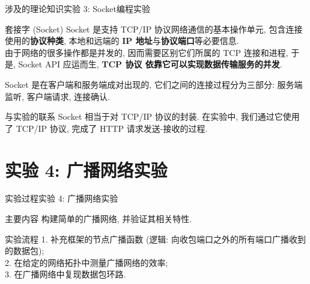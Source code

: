 \documentclass{beamer}
\begin{document}
\begin{frame}{涉及的理论知识}{实验 3: Socket编程实验}
    \begin{block}{套接字 (Socket)}
        Socket 是支持 TCP/IP 协议网络通信的基本操作单元,
        包含连接使用的\textbf{协议种类}, 本地和远端的
        \textbf{IP 地址}与\textbf{协议端口}等必要信息.\\
        由于网络的很多操作都是并发的, 因而需要区别它们所属的
        TCP 连接和进程, 于是, Socket API 应运而生, \textbf{TCP 协议
            依靠它可以实现数据传输服务的并发}.
    \end{block}
    Socket 是在客户端和服务端成对出现的,
    它们之间的连接过程分为三部分:
    服务端监听, 客户端请求, 连接确认.
    \begin{exampleblock}{与实验的联系}
        Socket 相当于对 TCP/IP 协议的封装. 在实验中,
        我们通过它使用了 TCP/IP 协议, 完成了 HTTP 请求发送-接收的过程.
    \end{exampleblock}
\end{frame}

\section{实验 4: 广播网络实验}
\begin{frame}
    \sectionpage
\end{frame}

\begin{frame}{实验过程}{实验 4: 广播网络实验}
    \begin{block}{主要内容}
        构建简单的广播网络, 并验证其相关特性.
    \end{block}

    \begin{block}{实验流程}
        1. 补充框架的节点广播函数
        (逻辑: 向收包端口之外的所有端口广播收到的数据包);\\
        2. 在给定的网络拓扑中测量广播网络的效率;\\
        3. 在广播网络中复现数据包环路.
    \end{block}
\end{frame}
\end{document}
